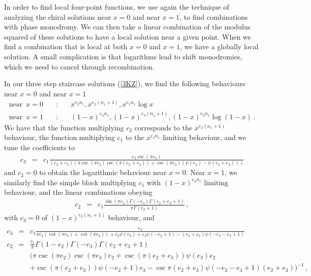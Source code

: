 \documentclass[12pt]{article}
\numberwithin{equation}{section}
\numberwithin{equation}{section}
\numberwithin{table}{section}\setlength{\multlinegap}{25pt}
\begin{document}
In order to find local four-point functions, we use again the technique of analyzing the chiral solutions near $x=0$ and near
$x=1$, to find combinations with phase monodromy. We can then take a linear combination of the modulus squared of these 
solutions to have a local solution near a given point. When we find a combination that is local at both $x=0$ and $x=1$,
we have a globally local solution. A small complication is that logarithms lead to shift monodromies, which we need
to cancel through recombination.

In our three step staircase solutions (\ref{3KZ}), we find the following behaviours near $x=0$ and near $x=1$
\begin{eqnarray}
\mbox{near} \, \, \,  x=0 \quad & : & \quad x^{e_2 n_1}, x^{e_2 (n_1+1)}, x^{e_2 n_1} \log x
\nonumber \\
\mbox{near} \, \, \, x=1 \quad & : &  \quad (1-x)^{e_3 n_1}, (1-x)^{e_3 (n_1+1)}, (1-x)^{e_3 n_1} \log (1-x) \, .
\end{eqnarray}
We have that the function multiplying $c_2$ corresponds to the $x^{e_2 (n_1+1)}$ behaviour, the function
multiplying $c_1$ to the 
$x^{e_2 n_1}$ limiting behaviour, and we tune the coefficients to 
\begin{eqnarray}
c_3 &=& c_1 \frac{ e_2  \csc \left(\pi  e_3\right) }{\left(e_2+e_3\right) \left(\pi  \csc \left(\pi  e_2\right) \csc \left(\pi  \left(e_2+e_3\right)\right)+\csc
   \left(\pi  e_3\right) \left(\psi \left(e_2\right)-\psi \left(e_2+e_3\right)\right)\right)}
\end{eqnarray}
and $c_2=0$ to obtain the logarithmic behaviour near $x=0$.
Near $x=1$, we similarly find the simple block multiplying $c_1$ with $(1-x)^{e_3 n_1}$ limiting behaviour, and the linear combinations obeying
\begin{eqnarray}
c_2 &=& c_1  \frac{ \sin \left(\pi  e_3\right) \Gamma \left(-e_3\right) \Gamma \left(e_2+e_3+1\right)}{\pi  \Gamma
   \left(e_2+1\right)} \, ,
\end{eqnarray}
with $c_3=0$ of $(1-x)^{e_3(n_1+1)}$ behaviour,
and
\begin{eqnarray}
\nonumber \\
c_3 & = & c_1  \frac{e_2}{\pi  e_2 \left(\cot \left(\pi  e_2\right)+\cot
   \left(\pi  e_3\right)\right)+ e_2 \psi \left(e_3\right) 
+ e_3 \psi(-e_2+1) - (e_2+e_3) \psi(-e_2-e_3+1)} 
\nonumber \\
c_2 &=& \frac{c_1}{\pi}
   \Gamma \left(1-e_2\right) \Gamma \left(-e_3\right) \Gamma \left(e_2+e_3+1\right) \nonumber \\
& & ( \pi \csc (\pi e_2) \csc (\pi e_3) e_2 + \csc (\pi (e_2+e_3)) \psi(e_3) e_2 
\nonumber \\
& & 
+ \csc(\pi (e_2+e_3)) \psi(-e_2+1) e_3 -
\csc \pi(e_2+e_3) \psi(-e_2-e_3+1) (e_2+e_3) )^{-1} \, , 
\end{eqnarray}
\end{document}
